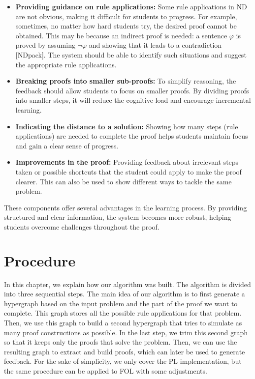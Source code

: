 \documentclass[runningheads]{llncs}
\begin{document}
\begin{itemize}

\item \textbf {Providing guidance on rule applications:} Some rule applications in ND are not obvious, making it difficult for students to progress. For example, sometimes, no matter how hard students try, the desired proof cannot be obtained. This may be because an indirect proof is needed: a sentence \(\varphi\) is proved by assuming \(\neg \varphi\) and showing that it leads to a contradiction [NDpack]. The system should be able to identify such situations and suggest the appropriate rule applications.

\item \textbf {Breaking proofs into smaller sub-proofs:} To simplify reasoning, the feedback should allow students to focus on smaller proofs. By dividing proofs into smaller steps, it will reduce the cognitive load and encourage incremental learning. 

\item \textbf{Indicating the distance to a solution:} Showing how many steps (rule applications) are needed to complete the proof helps students maintain focus and gain a clear sense of progress.

\item \textbf{Improvements in the proof:} Providing feedback about irrelevant steps taken or possible shortcuts that the student could apply to make the proof clearer. This can also be used to show different ways to tackle the same problem.

\end{itemize}

These components offer several advantages in the learning process. By providing structured and clear information, the system becomes more robust, helping students overcome challenges throughout the proof.

\section{Procedure}
In this chapter, we explain how our algorithm was built. The algorithm is divided into three sequential steps. 
The main idea of our algorithm is to first generate a hypergraph based on the input problem and the part of the proof we want to complete. This graph stores all the possible rule applications for that problem. Then, we use this graph to build a second hypergraph that tries to simulate as many proof constructions as possible. In the last step, we trim this second graph so that it keeps only the proofs that solve the problem. Then, we can use the resulting graph to extract and build proofs, which can later be used to generate feedback. For the sake of simplicity, we only cover the PL implementation, but the same procedure can be applied to FOL with some adjustments.
\end{document}
